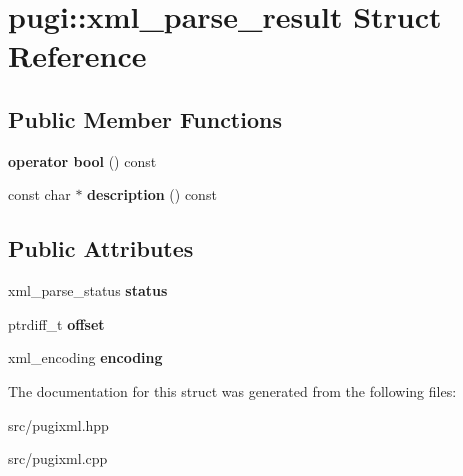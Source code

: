 \hypertarget{structpugi_1_1xml__parse__result}{}\section{pugi\+:\+:xml\+\_\+parse\+\_\+result Struct Reference}
\label{structpugi_1_1xml__parse__result}
\subsection*{Public Member Functions}
\begin{DoxyCompactItemize}
\item 
\mbox{\label{structpugi_1_1xml__parse__result_a34fdd9f0cdb4ba1eebd8de70ad4c72b1}} 
{\bfseries operator bool} () const
\item 
\mbox{\label{structpugi_1_1xml__parse__result_a3e9fca34ca2c44d69811f5483a6f2f45}} 
const char $\ast$ {\bfseries description} () const
\end{DoxyCompactItemize}
\subsection*{Public Attributes}
\begin{DoxyCompactItemize}
\item 
\mbox{\label{structpugi_1_1xml__parse__result_af8b3e6badea671931017695c8a9dd1af}} 
xml\+\_\+parse\+\_\+status {\bfseries status}
\item 
\mbox{\label{structpugi_1_1xml__parse__result_adb61df40459ba6fb1083d22467983086}} 
ptrdiff\+\_\+t {\bfseries offset}
\item 
\mbox{\label{structpugi_1_1xml__parse__result_ad11f279dfce644dfe297e24dc5f72c01}} 
xml\+\_\+encoding {\bfseries encoding}
\end{DoxyCompactItemize}


The documentation for this struct was generated from the following files\+:\begin{DoxyCompactItemize}
\item 
src/pugixml.\+hpp\item 
src/pugixml.\+cpp\end{DoxyCompactItemize}
